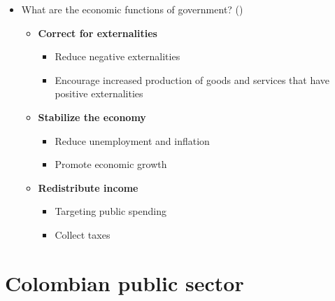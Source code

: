 \documentclass[
  ignorenonframetext,
]{beamer}
\providecommand{\tightlist}{%
  \setlength{\itemsep}{0pt}\setlength{\parskip}{0pt}}\usepackage{longtable,booktabs,array}
\begin{document}
\begin{frame}{}
\label{section-3}
\begin{itemize}
\item
  What are the economic functions of government?
  ()

  \begin{itemize}
  \item
    \textbf{Correct for externalities}

    \begin{itemize}
    \tightlist
    \item
      Reduce negative externalities
    \item
      Encourage increased production of goods and services that have
      positive externalities
    \end{itemize}
  \item
    \textbf{Stabilize the economy}

    \begin{itemize}
    \tightlist
    \item
      Reduce unemployment and inflation
    \item
      Promote economic growth
    \end{itemize}
  \item
    \textbf{Redistribute income}

    \begin{itemize}
    \tightlist
    \item
      Targeting public spending
    \item
      Collect taxes
    \end{itemize}
  \end{itemize}
\end{itemize}
\end{frame}

\section{Colombian public sector}\label{colombian-public-sector}
\end{document}
